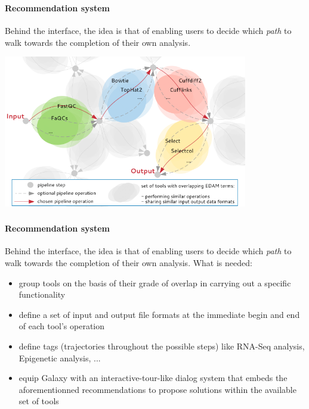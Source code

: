 \documentclass[xcolor=dvipsnames]{beamer}
\begin{document}
\begin{frame}
  \frametitle{\four}
  \framesubtitle{Recommendation system}
  Behind the interface, the idea is that of enabling users to decide which \emph{path} to walk towards the completion of their own analysis.
  \vspace{-0.2cm}
  \begin{center}
    \includegraphics[width=0.80\textwidth]{images/recommendation_system}
  \end{center}
\end{frame}

\begin{frame}
  \frametitle{\four}
  \framesubtitle{Recommendation system}
  Behind the interface, the idea is that of enabling users to decide which \emph{path} to walk towards the completion of their own analysis.\newline\newline
  What is needed:
  \vspace{0.1cm}
  \begin{itemize}
    \item group tools on the basis of their grade of overlap in carrying out a specific functionality
    \item define a set of input and output file formats at the immediate begin and end of each tool's operation
    \item define tags (trajectories throughout the possible steps) like RNA-Seq analysis, Epigenetic analysis, ...
    \item equip Galaxy with an interactive-tour-like dialog system that embeds the aforementionned recommendations to propose solutions within the available set of tools
  \end{itemize}
\end{frame}
\end{document}
